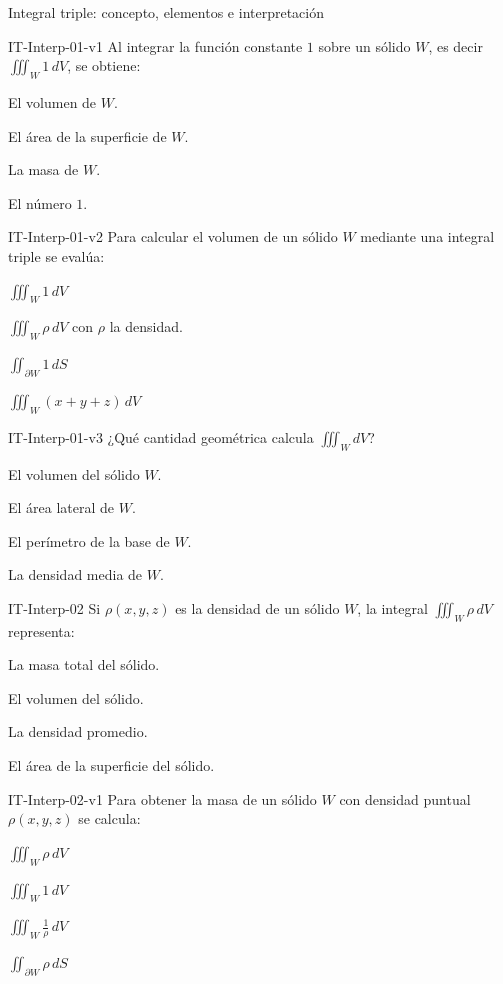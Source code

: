\documentclass[a4,11pt]{aleph-notas}
\begin{document}
\begin{quiz}{Integral triple: concepto, elementos e interpretación}
\begin{multi}[]%
    {IT-Interp-01-v1}
    Al integrar la función constante $1$ sobre un sólido $W$, es decir $\displaystyle\iiint_W 1\,dV$, se obtiene:
    \item* El volumen de $W$.
    \item El área de la superficie de $W$.
    \item La masa de $W$.
    \item El número $1$.
\end{multi}

\begin{multi}[]%
    {IT-Interp-01-v2}
    Para calcular el volumen de un sólido $W$ mediante una integral triple se evalúa:
    \item* $\displaystyle\iiint_W 1\,dV$
    \item $\displaystyle\iiint_W \rho\,dV$ con $\rho$ la densidad.
    \item $\displaystyle\iint_{\partial W} 1\,dS$
    \item $\displaystyle\iiint_W (x+y+z)\,dV$
\end{multi}

\begin{multi}[]%
    {IT-Interp-01-v3}
    ¿Qué cantidad geométrica calcula $\displaystyle\iiint_W dV$?
    \item* El volumen del sólido $W$.
    \item El área lateral de $W$.
    \item El perímetro de la base de $W$.
    \item La densidad media de $W$.
\end{multi}

\begin{multi}[]%
    {IT-Interp-02}
    Si $\rho(x,y,z)$ es la densidad de un sólido $W$, la integral $\displaystyle\iiint_W \rho\,dV$ representa:
    \item* La masa total del sólido.
    \item El volumen del sólido.
    \item La densidad promedio.
    \item El área de la superficie del sólido.
\end{multi}

\begin{multi}[]%
    {IT-Interp-02-v1}
    Para obtener la masa de un sólido $W$ con densidad puntual $\rho(x,y,z)$ se calcula:
    \item* $\displaystyle\iiint_W \rho\,dV$
    \item $\displaystyle\iiint_W 1\,dV$
    \item $\displaystyle\iiint_W \frac{1}{\rho}\,dV$
    \item $\displaystyle\iint_{\partial W} \rho\,dS$
\end{multi}


\end{quiz}
\end{document}
